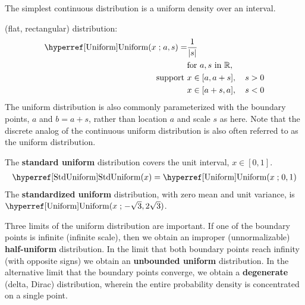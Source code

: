 


\label{sec:Uniform}
The simplest continuous distribution is a uniform density over an interval.

  (flat, rectangular) distribution: 
\begin{align}
\label{Uniform}
\opr{Uniform}(x\given a,s) =& \frac{1}{|s|} 				\checked 
\\
& \text{for } a, s  \text{ in } \mathbb{R}, 				\checked
\notag\\   
\text{ support } & x\in  [a,a+s], \quad s>0  			\checked
\notag \\ 
& x\in    [a+s,a], \quad s<0 \notag					\checked
\end{align}
The uniform distribution is also commonly parameterized with the boundary points, $a$ and $b=a+s$, rather than location $a$ and scale $s$ as here. 
Note that the discrete analog of the continuous uniform distribution is  also often referred to as the uniform distribution.



The {\bf standard uniform} distribution covers the unit interval, $x\in[0,1]$.
\begin{align}
\label{StdUniform}
\opr{StdUniform}(x)  = \opr{Uniform}(x\given 0,1) \checked
\end{align}
The {\bf standardized uniform} distribution, with zero mean and unit variance, is $\opr{Uniform}(x\given -\sqrt{3},2\sqrt{3})$.

Three limits of the uniform distribution are important. If one of the boundary points is infinite (infinite scale), then we obtain an improper (unnormalizable) {\bf half-uniform} distribution. In the limit that both boundary points reach infinity (with opposite signs) we obtain an {\bf unbounded uniform} distribution.
In the alternative limit that the boundary points converge, we obtain a {\bf degenerate} (delta, Dirac) \label{Delta} distribution, wherein the entire probability density  is concentrated on a single point.




